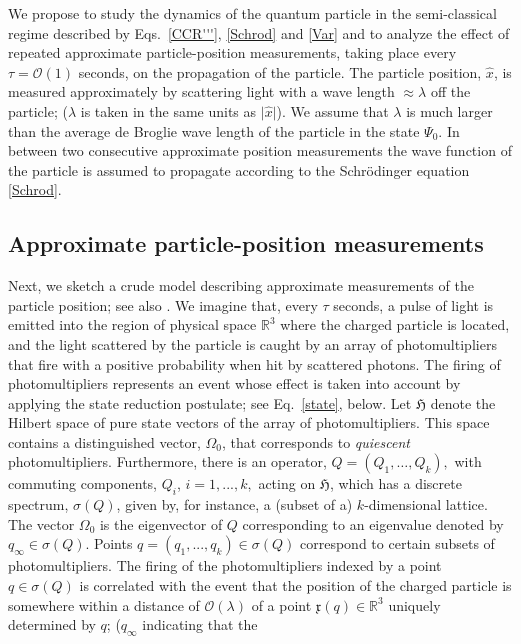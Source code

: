 \documentclass[12pt]{article}
\begin{document}
We propose to study the dynamics of the quantum particle in the semi-classical regime described by Eqs.~\eqref{CCR'''}, 
\eqref{Schrod} and \eqref{Var} and to analyze the effect of repeated approximate particle-position measurements, 
taking place every $\tau= \mathcal{O}(1)$ seconds, on the propagation of the particle. The particle position, $\hat{x}$, 
is measured approximately by scattering light with a wave length $\approx \lambda$ off the particle; 
($\lambda$ is taken in the same units as $\vert \hat{x}\vert$). We assume that $\lambda$ is much 
larger than the average de Broglie wave length of the particle in the state $\Psi_0$. In between two consecutive approximate 
position measurements the wave function of the particle is assumed to propagate according to the Schr\"odinger 
equation \eqref{Schrod}.

\subsection{Approximate particle-position measurements}\label{particle position}
Next, we sketch a crude model describing approximate measurements of the particle position; see also \cite{BBFF}.  
We imagine that, every $\tau$ seconds, a pulse of light is emitted into the region of 
physical space $\mathbb{R}^{3}$ where the charged particle is located, and the light scattered by the particle is caught 
by an array of photomultipliers that fire with a positive probability when hit by scattered photons. The firing of 
photomultipliers represents an event whose effect is taken into account by applying the state reduction postulate; 
see Eq.~\eqref{state}, below.  Let $\mathfrak{H}$ denote the Hilbert space of pure state vectors of the array of 
photomultipliers. This space contains a distinguished vector, $\Omega_0$, that corresponds to \textit{quiescent} 
photomultipliers.
Furthermore, there is an operator, $Q=(Q_1, \dots, Q_k),$ with commuting components, $Q_i$, $i=1, ..., k,$ acting 
on $\mathfrak{H}$, which has a discrete spectrum, $\sigma(Q)$, given by, for instance, a (subset of
a) $k$-dimensional lattice. The vector $\Omega_0$ is the eigenvector of $Q$ corresponding to an eigenvalue 
denoted by $q_{\infty} \in \sigma(Q)$. Points $q=(q_1, ..., q_k) \in \sigma(Q)$ correspond to certain subsets of 
photomultipliers. The firing of the photomultipliers indexed by a point $q \in \sigma(Q)$ is correlated with the 
event that the position of the charged particle is somewhere within a distance of $\mathcal{O}(\lambda)$ of 
a point $\mathfrak{x}(q) \in \mathbb{R}^{3}$ uniquely determined by $q$; ($q_{\infty}$ indicating that the
\end{document}
